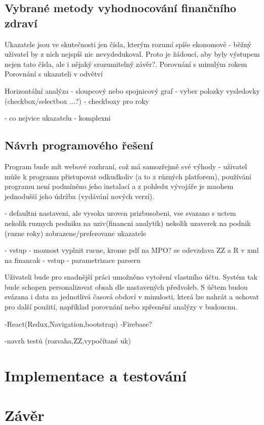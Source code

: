 \section{Vybrané metody vyhodnocování finančního zdraví}
Ukazatele jsou ve skutečnosti jen čísla, kterým rozumí spíše ekonomové - běžný uživatel by z nich nejspíš nic nevydedukoval. Proto je žádoucí, aby byly výstupem nejen tato čísla, ale i nějaký srozumitelný závěr?.
Porovnání s minulým rokem
Porovnání s ukazateli v odvětví

Horizontální analýza
- sloupcový nebo spojnicový graf
- vyber polozky vysledovky (checkbox/selectbox ...?)
- checkboxy pro roky

- co nejvice ukazatelu - komplexni

\section{Návrh programového řešení}
Program bude mít webové rozhraní, což má samozřejmě své výhody - uživatel může k programu přistupovat odkudkoliv (a to z různých platforem), používání programu není podmíněno jeho instalací a z pohledu vývojáře je mnohem jednodušší jeho údržba (vydávání nových verzí).

- defaultni nastaveni, ale vysoka uroven prizbusobeni, vse svazano s uctem
 nekolik ruznych podniku na uziv(financni analytik)
 nekolik uzaverek na podnik (ruzne roky)
 zobrazene/preferovane ukazatele
 
- vstup - moznost vyplnit rucne, krome pdf na MPO? se odevzdava ZZ a R v xml na financak
- vstup - parametrizace parseru

Uživateli bude pro snadnější práci umožněno vytoření vlastního účtu. Systém tak bude schopen personalizovat obsah dle nastavených předvoleb. S účtem budou svázana i data za jednotlivá časová obdoví v minulosti, která lze nahrát a uchovat pro další použití, například porovnání nebo zpřesnění analýzy v budoucnu.

-React(Redux,Navigation,bootstrap)
-Firebase?

-navrh testů (rozvaha,ZZ,vypočítané uk)

\chapter{Implementace a testování}
\chapter{Závěr}
